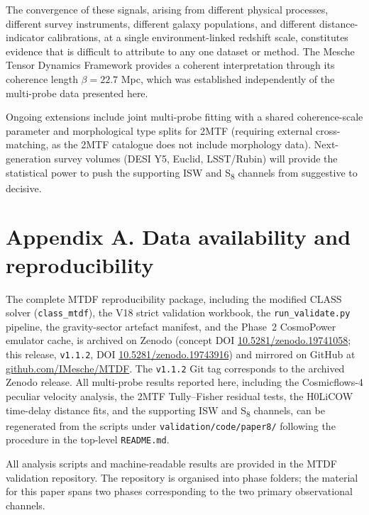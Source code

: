 \documentclass[11pt,a4paper]{article}
\begin{document}
The convergence of these signals, arising from different physical processes, different survey instruments, different galaxy populations, and different distance-indicator calibrations, at a single environment-linked redshift scale, constitutes evidence that is difficult to attribute to any one dataset or method. The Mesche Tensor Dynamics Framework provides a coherent interpretation through its coherence length \(\beta = 22.7\) Mpc, which was established independently of the multi-probe data presented here.

Ongoing extensions include joint multi-probe fitting with a shared coherence-scale parameter and morphological type splits for 2MTF (requiring external cross-matching, as the 2MTF catalogue does not include morphology data). Next-generation survey volumes (DESI Y5, Euclid, LSST/\allowbreak{}Rubin) will provide the statistical power to push the supporting ISW and S\textsubscript{8} channels from suggestive to decisive.

\section{Appendix A. Data availability and reproducibility}
\label{sec:secA}

The complete MTDF reproducibility package, including the modified CLASS solver
(\texttt{class\_\allowbreak{}mtdf}), the V18 strict validation workbook, the
\texttt{run\_\allowbreak{}validate.py} pipeline, the gravity-sector artefact
manifest, and the Phase~2 CosmoPower emulator cache, is archived on Zenodo
(concept DOI \href{https://doi.org/10.5281/zenodo.19741058}{10.5281/\allowbreak{}zenodo.\allowbreak{}19741058};
this release, \texttt{v1.1.2}, DOI
\href{https://doi.org/10.5281/zenodo.19743916}{10.5281/\allowbreak{}zenodo.\allowbreak{}19743916})
and mirrored on GitHub at
\href{https://github.com/IMesche/MTDF}{github.com/\allowbreak{}IMesche/\allowbreak{}MTDF}.
The \texttt{v1.1.2} Git tag corresponds to the archived Zenodo release. All
multi-probe results reported here, including the Cosmicflows-4 peculiar
velocity analysis, the 2MTF Tully--Fisher residual tests, the H0LiCOW
time-delay distance fits, and the supporting ISW and S\textsubscript{8} channels,
can be regenerated from the scripts under \texttt{validation/\allowbreak{}code/\allowbreak{}paper8/\allowbreak{}}
following the procedure in the top-level \texttt{README.md}.

All analysis scripts and machine-readable results are provided in the MTDF validation repository. The repository is organised into phase folders; the material for this paper spans two phases corresponding to the two primary observational channels.
\end{document}
